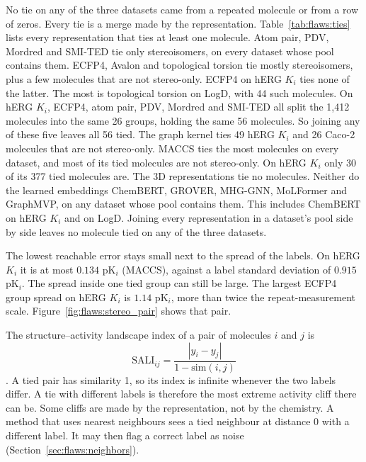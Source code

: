 No tie on any of the three datasets came from a repeated molecule or from a row of zeros. Every tie is a merge made by the representation. Table~\ref{tab:flaws:ties} lists every representation that ties at least one molecule. Atom pair, PDV, Mordred and SMI-TED tie only stereoisomers, on every dataset whose pool contains them. ECFP4, Avalon and topological torsion tie mostly stereoisomers, plus a few molecules that are not stereo-only. ECFP4 on hERG $K_i$ ties none of the latter. The most is topological torsion on LogD, with 44 such molecules. On hERG $K_i$, ECFP4, atom pair, PDV, Mordred and SMI-TED all split the 1,412 molecules into the same 26 groups, holding the same 56 molecules. So joining any of these five leaves all 56 tied. The graph kernel ties 49 hERG $K_i$ and 26 Caco-2 molecules that are not stereo-only. MACCS ties the most molecules on every dataset, and most of its tied molecules are not stereo-only. On hERG $K_i$ only 30 of its 377 tied molecules are. The 3D representations tie no molecules. Neither do the learned embeddings ChemBERT, GROVER, MHG-GNN, MoLFormer and GraphMVP, on any dataset whose pool contains them. %
This includes ChemBERT on hERG $K_i$ and on LogD. Joining every representation in a dataset's pool side by side leaves no molecule tied on any of the three datasets.

The lowest reachable error stays small next to the spread of the labels. On hERG $K_i$ it is at most $0.134$ pK$_i$ (MACCS), against a label standard deviation of $0.915$ pK$_i$. The spread inside one tied group can still be large. The largest ECFP4 group spread on hERG $K_i$ is $1.14$ pK$_i$, more than twice the repeat-measurement scale. Figure~\ref{fig:flaws:stereo_pair} shows that pair.

The structure--activity landscape index of a pair of molecules $i$ and $j$ is
\begin{equation}
\mathrm{SALI}_{ij} = \frac{|y_i - y_j|}{1 - \mathrm{sim}(i,j)}
\end{equation}
\citep{Guha2008}. A tied pair has similarity 1, so its index is infinite whenever the two labels differ. A tie with different labels is therefore the most extreme activity cliff there can be. Some cliffs are made by the representation, not by the chemistry. A method that uses nearest neighbours sees a tied neighbour at distance 0 with a different label. %
It may then flag a correct label as noise (Section~\ref{sec:flaws:neighbors}).

